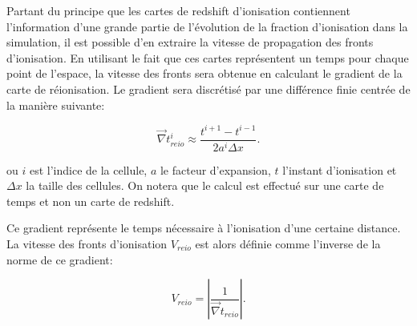 Partant du principe que les cartes de redshift d'ionisation contiennent l'information d'une grande partie de l'évolution de la fraction d'ionisation dans la simulation, il est possible d'en extraire la vitesse de propagation des fronts d'ionisation.
En utilisant le fait que ces cartes représentent un temps pour chaque point de l'espace, la vitesse des fronts sera obtenue en calculant le gradient de la carte de réionisation.
Le gradient sera discrétisé par une différence finie centrée de la manière suivante:

\begin{equation}
\vec{\nabla} t_{reio}^i \approx \frac{t^{i+1}  - t^{i-1}}{2a^i \Delta x }. %
\end{equation}

ou $i$ est l'indice de la cellule, $a$ le facteur d'expansion, $t$ l'instant d'ionisation et $\Delta x$ la taille des cellules.
On notera que le calcul est effectué sur une carte de temps et non un carte de redshift.

Ce gradient représente le temps nécessaire à l'ionisation d'une certaine distance.
La vitesse des fronts d'ionisation $V_{reio}$ est alors définie comme l'inverse de la norme de ce gradient:

\begin{equation}
V_{reio}  = \left | \frac{1}{ \vec{\nabla} t_{reio}} \right| .
\end{equation}

